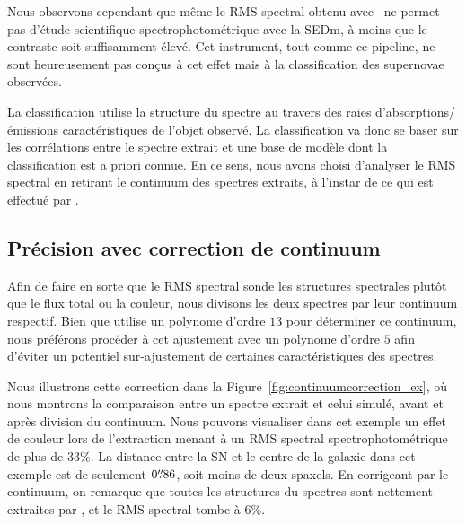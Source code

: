 \documentclass[../main/main.tex]{subfiles}
\begin{document}
Nous observons cependant que même le RMS spectral obtenu avec \hypergal\
ne permet pas d'étude scientifique
spectrophotométrique avec la SEDm, à moins que le contraste soit
suffisamment élevé.
Cet instrument, tout comme ce pipeline, ne sont heureusement pas conçus à
cet effet mais à la classification des supernovae observées.

La classification utilise la structure du spectre au travers des raies
d'absorptions/émissions caractéristiques de l'objet observé. La
classification va donc se baser sur les corrélations entre le spectre
extrait et une base de modèle dont la classification est a priori
connue. En ce sens, nous avons choisi d'analyser le RMS spectral en
retirant le continuum des spectres extraits, à l'instar de ce qui est
effectué par \pkg{SNID} \citep{BlondinSNID}.


\subsection{Précision avec correction de continuum}

Afin de faire en sorte que le RMS spectral sonde les structures spectrales
plutôt que le flux total ou la couleur, nous divisons les deux spectres par leur continuum
respectif. Bien que \pkg{SNID} utilise un polynome 
d'ordre $13$ pour déterminer ce continuum, nous préférons procéder à
cet ajustement avec un polynome
d'ordre $5$ afin d'éviter un potentiel sur-ajustement de certaines
caractéristiques des spectres.

Nous illustrons cette correction dans la
Figure~\ref{fig:continuumcorrection_ex}, où nous montrons la comparaison
entre un spectre extrait et celui simulé, avant et après division du
continuum. Nous pouvons visualiser dans cet exemple un effet de couleur
lors de l'extraction menant à un RMS spectral spectrophotométrique de
plus de $33\%$. La distance entre la SN et le centre de la galaxie dans
cet exemple est de seulement $0\overset{\prime\prime}{.}86$, soit moins de deux
spaxels. En corrigeant par le continuum, on remarque que toutes
les structures du spectres sont nettement extraites par \hypergal, et
le RMS spectral tombe à $6\%$.
\end{document}
